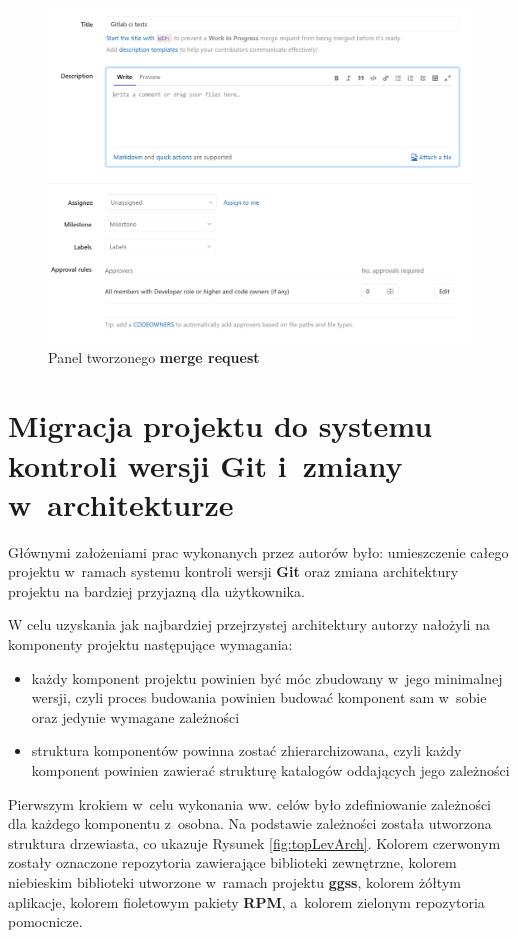 \begin{figure}
\centering
\includegraphics[width=\textwidth]{res/png/panelMergeRequest}
\caption{Panel tworzonego \textbf{merge request}}
\label{fig:mergeRequestPanel}
\end{figure}

\newpage

\section{Migracja projektu do systemu kontroli wersji Git i~zmiany w~architekturze}

Głównymi założeniami prac wykonanych przez autorów było: umieszczenie całego projektu w~ramach systemu kontroli wersji \textbf{Git} oraz zmiana architektury projektu na bardziej przyjazną dla użytkownika.

W celu uzyskania jak najbardziej przejrzystej architektury autorzy nałożyli na komponenty projektu następujące wymagania:
\begin{itemize}
\item każdy komponent projektu powinien być móc zbudowany w~jego minimalnej wersji, czyli proces budowania powinien budować komponent sam w~sobie oraz jedynie wymagane zależności
\item struktura komponentów powinna zostać zhierarchizowana, czyli każdy komponent powinien zawierać strukturę katalogów oddających jego zależności
\end{itemize}

Pierwszym krokiem w~celu wykonania ww. celów było zdefiniowanie zależności dla każdego komponentu z~osobna. Na podstawie zależności została utworzona struktura drzewiasta, co ukazuje Rysunek \ref{fig:topLevArch}. Kolorem czerwonym zostały oznaczone repozytoria zawierające biblioteki zewnętrzne, kolorem niebieskim biblioteki utworzone w~ramach projektu \textbf{ggss}, kolorem żółtym aplikacje, kolorem fioletowym pakiety \textbf{RPM}, a~kolorem zielonym repozytoria pomocnicze.

